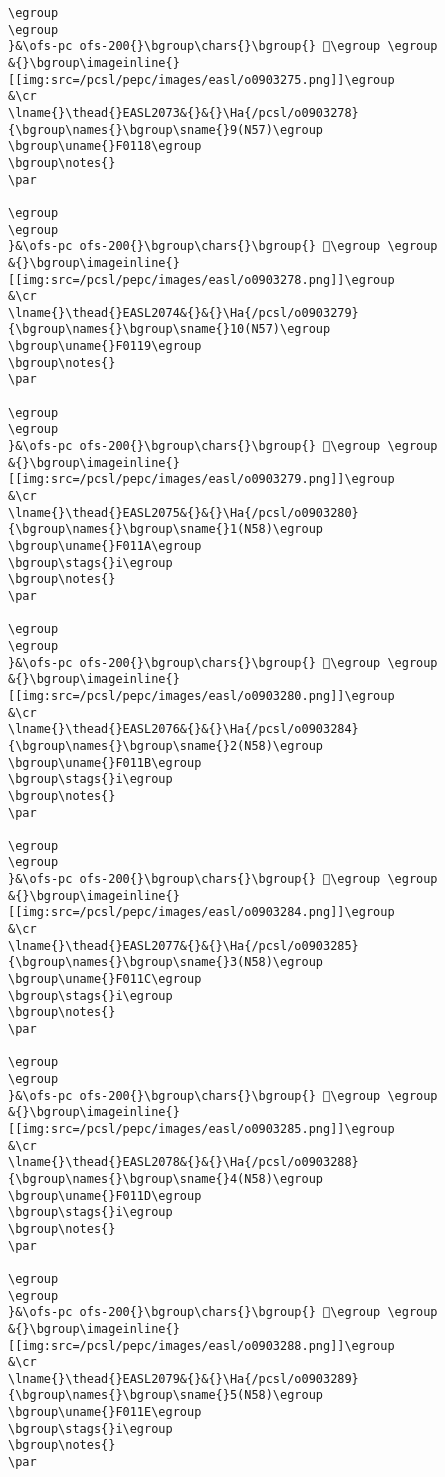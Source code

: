 \begin{verbatim}
\egroup
\egroup
}&\ofs-pc ofs-200{}\bgroup\chars{}\bgroup{} 󰄗\egroup \egroup
&{}\bgroup\imageinline{}[[img:src=/pcsl/pepc/images/easl/o0903275.png]]\egroup
&\cr
\lname{}\thead{}EASL2073&{}&{}\Ha{/pcsl/o0903278}{\bgroup\names{}\bgroup\sname{}9(N57)\egroup
\bgroup\uname{}F0118\egroup
\bgroup\notes{}
\par 

\egroup
\egroup
}&\ofs-pc ofs-200{}\bgroup\chars{}\bgroup{} 󰄘\egroup \egroup
&{}\bgroup\imageinline{}[[img:src=/pcsl/pepc/images/easl/o0903278.png]]\egroup
&\cr
\lname{}\thead{}EASL2074&{}&{}\Ha{/pcsl/o0903279}{\bgroup\names{}\bgroup\sname{}10(N57)\egroup
\bgroup\uname{}F0119\egroup
\bgroup\notes{}
\par 

\egroup
\egroup
}&\ofs-pc ofs-200{}\bgroup\chars{}\bgroup{} 󰄙\egroup \egroup
&{}\bgroup\imageinline{}[[img:src=/pcsl/pepc/images/easl/o0903279.png]]\egroup
&\cr
\lname{}\thead{}EASL2075&{}&{}\Ha{/pcsl/o0903280}{\bgroup\names{}\bgroup\sname{}1(N58)\egroup
\bgroup\uname{}F011A\egroup
\bgroup\stags{}i\egroup
\bgroup\notes{}
\par 

\egroup
\egroup
}&\ofs-pc ofs-200{}\bgroup\chars{}\bgroup{} 󰄚\egroup \egroup
&{}\bgroup\imageinline{}[[img:src=/pcsl/pepc/images/easl/o0903280.png]]\egroup
&\cr
\lname{}\thead{}EASL2076&{}&{}\Ha{/pcsl/o0903284}{\bgroup\names{}\bgroup\sname{}2(N58)\egroup
\bgroup\uname{}F011B\egroup
\bgroup\stags{}i\egroup
\bgroup\notes{}
\par 

\egroup
\egroup
}&\ofs-pc ofs-200{}\bgroup\chars{}\bgroup{} 󰄛\egroup \egroup
&{}\bgroup\imageinline{}[[img:src=/pcsl/pepc/images/easl/o0903284.png]]\egroup
&\cr
\lname{}\thead{}EASL2077&{}&{}\Ha{/pcsl/o0903285}{\bgroup\names{}\bgroup\sname{}3(N58)\egroup
\bgroup\uname{}F011C\egroup
\bgroup\stags{}i\egroup
\bgroup\notes{}
\par 

\egroup
\egroup
}&\ofs-pc ofs-200{}\bgroup\chars{}\bgroup{} 󰄜\egroup \egroup
&{}\bgroup\imageinline{}[[img:src=/pcsl/pepc/images/easl/o0903285.png]]\egroup
&\cr
\lname{}\thead{}EASL2078&{}&{}\Ha{/pcsl/o0903288}{\bgroup\names{}\bgroup\sname{}4(N58)\egroup
\bgroup\uname{}F011D\egroup
\bgroup\stags{}i\egroup
\bgroup\notes{}
\par 

\egroup
\egroup
}&\ofs-pc ofs-200{}\bgroup\chars{}\bgroup{} 󰄝\egroup \egroup
&{}\bgroup\imageinline{}[[img:src=/pcsl/pepc/images/easl/o0903288.png]]\egroup
&\cr
\lname{}\thead{}EASL2079&{}&{}\Ha{/pcsl/o0903289}{\bgroup\names{}\bgroup\sname{}5(N58)\egroup
\bgroup\uname{}F011E\egroup
\bgroup\stags{}i\egroup
\bgroup\notes{}
\par 


\end{verbatim}
